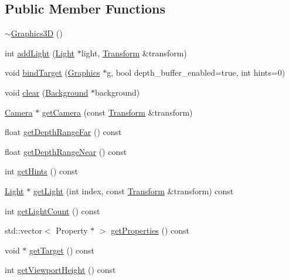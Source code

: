 \subsection*{Public Member Functions}
\begin{CompactItemize}
\item 
\hyperlink{classm3g_1_1Graphics3D_9b9347476fc10e57b31694ac8a628511}{$\sim$Graphics3D} ()
\item 
int \hyperlink{classm3g_1_1Graphics3D_e210cacb72c8540df86a6674e3c2dc4f}{addLight} (\hyperlink{classm3g_1_1Light}{Light} $\ast$light, \hyperlink{classm3g_1_1Transform}{Transform} \&transform)
\item 
void \hyperlink{classm3g_1_1Graphics3D_2173e179f4b2d7130cde46a48794ee66}{bindTarget} (\hyperlink{classm3g_1_1Graphics}{Graphics} $\ast$g, bool depth\_\-buffer\_\-enabled=true, int hints=0)
\item 
void \hyperlink{classm3g_1_1Graphics3D_21c4a68a53cfbe0a7cec05d5a56682bf}{clear} (\hyperlink{classm3g_1_1Background}{Background} $\ast$background)
\item 
\hyperlink{classm3g_1_1Camera}{Camera} $\ast$ \hyperlink{classm3g_1_1Graphics3D_570b81f426d1b2b5e8794cffb33422c6}{getCamera} (const \hyperlink{classm3g_1_1Transform}{Transform} \&transform)
\item 
float \hyperlink{classm3g_1_1Graphics3D_c8c185b99073215202d2e35723f5c470}{getDepthRangeFar} () const 
\item 
float \hyperlink{classm3g_1_1Graphics3D_60bc116f673bf2782de2df3eebfb2c92}{getDepthRangeNear} () const 
\item 
int \hyperlink{classm3g_1_1Graphics3D_5837234a23dc5f46d3adec17f521b58e}{getHints} () const 
\item 
\hyperlink{classm3g_1_1Light}{Light} $\ast$ \hyperlink{classm3g_1_1Graphics3D_04272e584440c89fb4cb449003a84e7d}{getLight} (int index, const \hyperlink{classm3g_1_1Transform}{Transform} \&transform) const 
\item 
int \hyperlink{classm3g_1_1Graphics3D_7a08cfeb48d76ad5d8859a1fc0c77d98}{getLightCount} () const 
\item 
std::vector$<$ Property $\ast$ $>$ \hyperlink{classm3g_1_1Graphics3D_d87d3f8145ea47e2b736c6c3525dad5c}{getProperties} () const 
\item 
void $\ast$ \hyperlink{classm3g_1_1Graphics3D_02d0033930c8e68f4d7ebd43abe7980a}{getTarget} () const 
\item 
int \hyperlink{classm3g_1_1Graphics3D_d51e0c421126f5deb61b359cdb7dab2e}{getViewportHeight} () const 

\end{CompactItemize}
